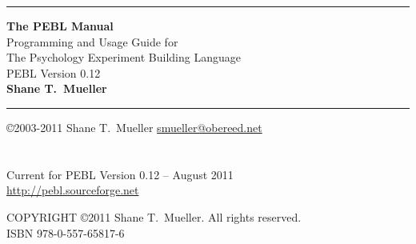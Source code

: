 \documentclass[10pt,twoside,openright,titlepage,letter]{book}
\begin{document}
\rule{\textwidth}{1mm}
\begin{center}
\LARGE
\textbf{The PEBL Manual} \\

\large
Programming and Usage Guide for\\
The Psychology Experiment Building Language\\
PEBL Version 0.12\\
\vspace{0.7cm}\Large \textbf{Shane T.~Mueller}
\end{center}
\rule{\textwidth}{1mm}


\vspace{.4cm}

\normalsize
\noindent\copyright 2003-2011 Shane T.~Mueller \href{mailto:smueller@obereed.net}{smueller@obereed.net}\\
\\
\\


Current for PEBL Version 0.12 -- August 2011 \\
\href{http://pebl.sourceforge.net}{http://pebl.sourceforge.net}


\newpage
\normalsize
\noindent COPYRIGHT \copyright 2011 Shane T.~Mueller. All rights reserved.\\
\vspace{2cm}
ISBN  978-0-557-65817-6\\

\tableofcontents

\clearpage
{}
\renewcommand{\chaptermark}[1]{\markboth{\textbf{Chapter \thechapter}.\ \emph{#1}}{}}







\appendix
\end{document}
